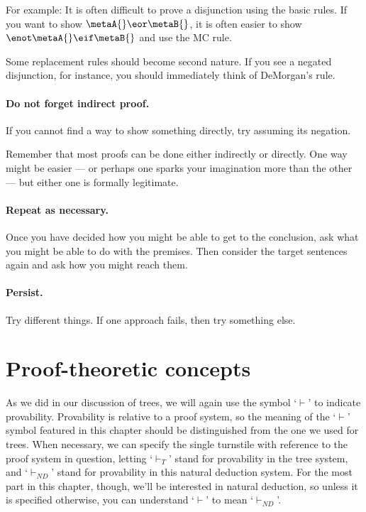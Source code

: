 For example: It is often difficult to prove a disjunction using the basic rules. If you want to show $\metaA{}\eor\metaB{}$, it is often easier to show $\enot\metaA{}\eif\metaB{}$ and use the MC rule.

Some replacement rules should become second nature. If you see a negated disjunction, for instance, you should immediately think of DeMorgan's rule.

\paragraph{Do not forget indirect proof.}
If you cannot find a way to show something directly, try assuming its negation.

Remember that most proofs can be done either indirectly or directly. One way might be easier --- or perhaps one sparks your imagination more than the other --- but either one is formally legitimate.

\paragraph{Repeat as necessary.} Once you have decided how you might be able to get to the conclusion, ask what you might be able to do with the premises. Then consider the target sentences again and ask how you might reach them.

\paragraph{Persist.}
Try different things. If one approach fails, then try something else.




\section{Proof-theoretic concepts}

As we did in our discussion of trees, we will again use the symbol `$\vdash$' to indicate provability. Provability is relative to a proof system, so the meaning of the `$\vdash$' symbol featured in this chapter should be distinguished from the one we used for trees. When necessary, we can specify the single turnstile with reference to the proof system in question, letting `$\vdash_{T}$' stand for provability in the tree system, and `$\vdash_{ND}$' stand for provability in this natural deduction system. For the most part in this chapter, though, we'll be interested in natural deduction, so unless it is specified otherwise, you can understand `$\vdash$' to mean `$\vdash_{ND}$'.

